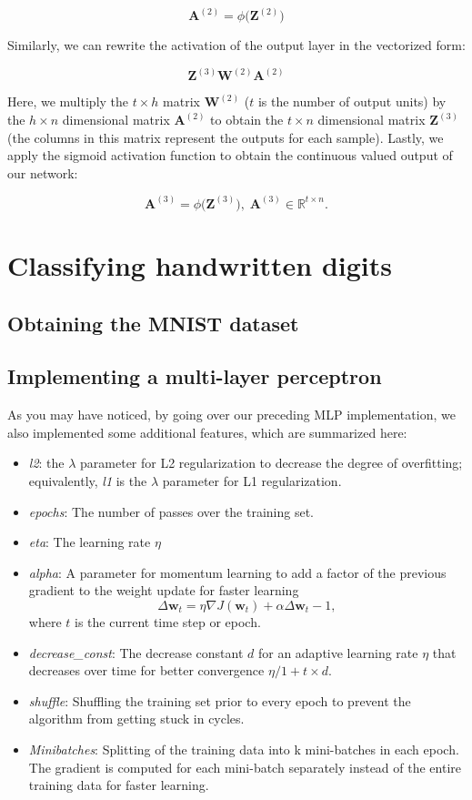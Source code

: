 \documentclass[letterpaper]{report}
\begin{document}
\[
\mathbf{A}^{(2)} = \phi \big( \mathbf{Z}^{(2)}  \big)
\]

Similarly, we can rewrite the activation of the output layer in the vectorized form:

\[
\mathbf{Z}^{(3)} \mathbf{W}^{(2)}  \mathbf{A}^{(2)} 
\]

Here, we multiply the $t \times h$ matrix $\mathbf{W}^{(2)}$ ($t$ is the number of output units) by the $h \times n$ dimensional matrix $\mathbf{A}^{(2)}$ to obtain the $t \times n$ dimensional matrix $\mathbf{Z}^{(3)}$ (the columns in this matrix represent the outputs for each sample). Lastly, we apply the sigmoid activation function to obtain the continuous valued output of our network:

\[
\mathbf{A}^{(3)} = \phi \big( \mathbf{Z}^{(3)} \big), \; \mathbf{A}^{(3)} \in \mathbb{R}^{t \times n}.
\]



\section{Classifying handwritten digits}
\subsection{Obtaining the MNIST dataset}
\subsection{Implementing a multi-layer perceptron}

As you may have noticed, by going over our preceding MLP implementation, we also implemented some additional features, which are summarized here:

\begin{itemize}
\item \textit{l2}: the $\lambda$ parameter for L2 regularization to decrease the degree of overfitting; equivalently, \textit{l1} is the $\lambda$ parameter for L1 regularization.
\item \textit{epochs}: The number of passes over the training set.
\item \textit{eta}: The learning rate $\eta$
\item \textit{alpha}: A parameter for momentum learning to add a factor of the previous gradient to the weight update for faster learning
\[
\Delta \mathbf{w}_t = \eta \nabla J(\mathbf{w}_t) + \alpha \Delta \mathbf{w}_t-1,
\]
where $t$ is the current time step or epoch.
\item \textit{decrease\_const}: The decrease constant $d$ for an adaptive learning rate $\eta$ that decreases over time for better convergence $\eta / 1 + t \times d .$
\item \textit{shuffle}: Shuffling the training set prior to every epoch to prevent the algorithm from getting stuck in cycles.
\item \textit{Minibatches}: Splitting of the training data into k mini-batches in each epoch. The gradient is computed for each mini-batch separately instead of the entire training data for faster learning.
\end{itemize}
\end{document}
